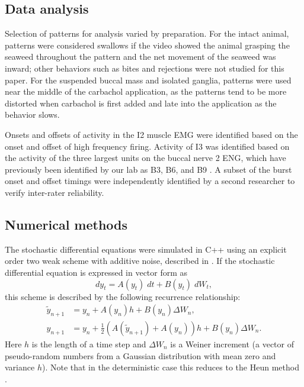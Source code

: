 \subsection{Data analysis}
Selection of patterns for analysis varied by preparation.  For the intact
animal, patterns were considered swallows if the video showed the animal
grasping the seaweed throughout the pattern and the net movement of the
seaweed was inward; other behaviors such as bites and rejections were not studied
for this paper.  For the suspended buccal mass and isolated ganglia, patterns
were used near the middle of the carbachol application, as the patterns tend to
be more distorted when carbachol is first added and late into the application
as the behavior slows.

Onsets and offsets of activity in the I2 muscle EMG were identified based on
the onset and offset of high frequency firing.  Activity of I3 was identified
based on the activity of the three largest units on the buccal nerve 2 ENG,
which have previously been identified by our lab as B3, B6, and B9
\citep{lu_extracellularly_2013}. A subset of the burst onset and offset timings
were independently identified by a second researcher to verify inter-rater
reliability.

\subsection{Numerical methods}
The stochastic differential equations were simulated in C++ using an
explicit order two weak scheme with additive noise, described in
\citet{kloeden_numerical_1992}.  If the stochastic differential
equation is expressed in vector form as
\begin{equation}
    dy_t = A(y_t)\;dt + B(y_t)\;dW_t,
\end{equation}
this scheme is described by the following recurrence relationship:
\begin{align}
    \tilde{y}_{n+1} &= y_n + A(y_n)h + B(y_n) \Delta W_n, \\
    y_{n+1} &= y_n + \tfrac{1}{2}(A(\tilde{y}_{n+1}) + A(y_n)) h + B(y_n) \Delta W_n.
\end{align}
Here $h$ is the length of a time step and $\Delta W_n$ is a Weiner increment (a
vector of pseudo-random numbers from a Gaussian distribution with mean zero and
variance $h$).  Note that in the deterministic case this reduces to the Heun
method \citep{kloeden_numerical_1992}.

